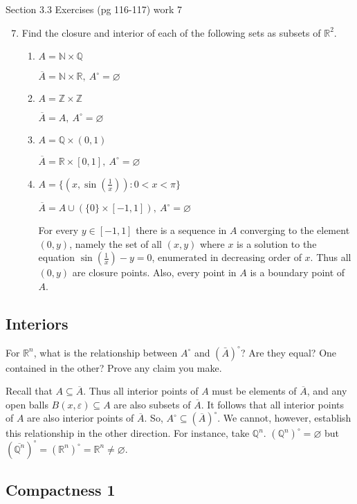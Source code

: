 \documentclass[11pt]{article}
\newcommand{\N}{\mathbb{N}}
\newcommand{\Z}{\mathbb{Z}}
\newcommand{\Q}{\mathbb{Q}}
\newcommand{\R}{\mathbb{R}}
\begin{document}
Section 3.3 Exercises (pg 116-117) work 7

\begin{enumerate}
\setcounter{enumi}{6}
\item{Find the closure and interior of each of the following sets as
subsets of $\R^2$.}
\begin{enumerate}
\item{$A=\N\times\Q$}

$\overline{A}=\N\times\R,\ A^\circ=\varnothing$
\item{$A=\Z\times\Z$}

$\overline{A}=A,\ A^\circ=\varnothing$
\item{$A=\Q\times (0,1)$}

$\overline{A}=\R\times [0,1],\ A^\circ=\varnothing$
\item{$A=\{(x, \sin (\frac{1}{x})):0<x<\pi\}$}

$\overline{A}=A\cup(\{0\}\times[-1,1]),\ A^\circ=\varnothing$

For every $y\in [-1,1]$
there is a sequence in $A$ converging to the element $(0,y)$, namely
the set of all $(x,y)$ where $x$ is a solution to the equation
$\sin(\frac{1}{x})-y=0$, enumerated in decreasing order of $x$. Thus
all $(0,y)$ are closure points.
Also, every point in $A$ is a boundary point of $A$. 
\end{enumerate}
\end{enumerate}

\subsection*{Interiors}

For $\R^n$, what is the relationship between $A^\circ$ and $({\bar A})^\circ$? Are they equal? One contained in the other? Prove any claim you make. 

Recall that $A\subseteq\overline{A}$. Thus all interior points of $A$ must
be elements of $\overline{A}$, and any open balls
$B(x,\varepsilon)\subseteq A$ are also subsets of $\overline{A}$. It
follows that all interior points of $A$ are also interior points of 
$\overline{A}$. So, $A^\circ\subseteq (\overline{A})^\circ$. We cannot,
however, establish this relationship in the other direction.
For instance, take $\Q^n$. $(\Q^n)^\circ=\varnothing$ but
$(\overline{\Q^n})^\circ = (\R^n)^\circ = \R^n \neq \varnothing$.

\subsection*{Compactness 1}
\end{document}
